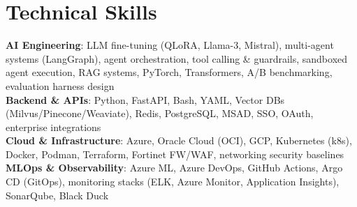\section{Technical Skills}
    \begin{itemize}[leftmargin=0.15in, label={}]
	\small{\item{
		\textbf{AI Engineering}{: LLM fine-tuning (QLoRA, Llama-3, Mistral), multi-agent systems (LangGraph), agent orchestration, tool calling \& guardrails, sandboxed agent execution, RAG systems, PyTorch, Transformers, A/B benchmarking, evaluation harness design} \\
		\textbf{Backend \& APIs}{: Python, FastAPI, Bash, YAML, Vector DBs (Milvus/Pinecone/Weaviate), Redis, PostgreSQL, MSAD, SSO, OAuth, enterprise integrations} \\
		\textbf{Cloud \& Infrastructure}{: Azure, Oracle Cloud (OCI), GCP, Kubernetes (k8s), Docker, Podman, Terraform, Fortinet FW/WAF, networking security baselines} \\
		\textbf{MLOps \& Observability}{: Azure ML, Azure DevOps, GitHub Actions, Argo CD (GitOps), monitoring stacks (ELK, Azure Monitor, Application Insights), SonarQube, Black Duck}
	}}
    \end{itemize}
